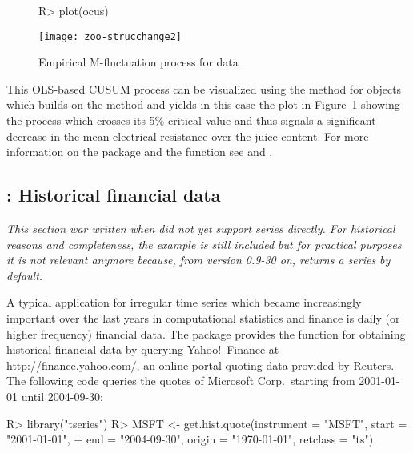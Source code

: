 \documentclass{Z}
\begin{document}
\begin{figure}[h!]
\begin{center}
\begin{Schunk}
\begin{Sinput}
R> plot(ocus)
\end{Sinput}
\end{Schunk}
\texttt{[image: zoo-strucchange2]}
\caption{\label{fig:strucchange} Empirical M-fluctuation process for  data}
\end{center}
\end{figure}

This OLS-based CUSUM process can be visualized using the  method
for  objects which builds on the  method and yields in
this case the plot in Figure~\ref{fig:strucchange} showing the process which
crosses its 5\% critical value and 
thus signals a significant decrease in the mean electrical resistance over the
juice content. For more information on the package  and the 
function  see \cite{zoo:Zeileis+Leisch+Hornik:2002} and 
\cite{zoo:Zeileis:2004}.


\subsection[tseries: Historical financial data]{: Historical financial data}
\label{sec:tseries}

\emph{This section war written when  did not yet support 
series directly. For historical reasons and completeness, the example is still
included but for practical purposes it is not relevant anymore because,
from version 0.9-30 on,  returns a  series by default.}

A typical application for irregular time series which became increasingly
important over the last years in computational statistics and finance is
daily (or higher frequency) financial data. The package  provides
the function  for obtaining historical financial data
by querying Yahoo!\ Finance at \url{http://finance.yahoo.com/},
an online portal quoting data provided by Reuters. The following code
queries the quotes of Microsoft Corp.\ starting from 2001-01-01
until 2004-09-30:

\begin{Schunk}
\begin{Sinput}
R> library("tseries")
R> MSFT <- get.hist.quote(instrument = "MSFT", start = "2001-01-01", 
+     end = "2004-09-30", origin = "1970-01-01", retclass = "ts")
\end{Sinput}
\end{Schunk}
\end{document}
